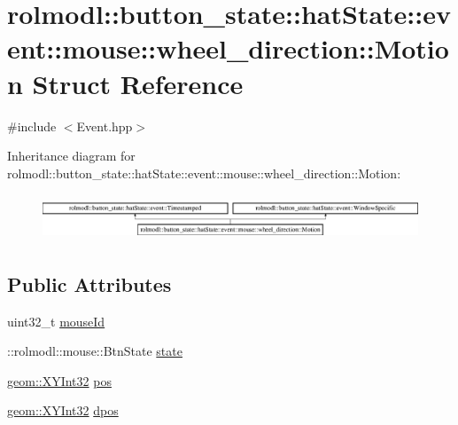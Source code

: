 \hypertarget{structrolmodl_1_1button__state_1_1hat_state_1_1event_1_1mouse_1_1wheel__direction_1_1_motion}{}\section{rolmodl\+::button\+\_\+state\+::hat\+State\+::event\+::mouse\+::wheel\+\_\+direction\+::Motion Struct Reference}
\label{structrolmodl_1_1button__state_1_1hat_state_1_1event_1_1mouse_1_1wheel__direction_1_1_motion}


{\ttfamily \#include $<$Event.\+hpp$>$}

Inheritance diagram for rolmodl\+::button\+\_\+state\+::hat\+State\+::event\+::mouse\+::wheel\+\_\+direction\+::Motion\+:\begin{figure}[H]
\begin{center}
\leavevmode
\includegraphics[height=1.389578cm]{structrolmodl_1_1button__state_1_1hat_state_1_1event_1_1mouse_1_1wheel__direction_1_1_motion}
\end{center}
\end{figure}
\subsection*{Public Attributes}
\begin{DoxyCompactItemize}
\item 
uint32\+\_\+t \mbox{\hyperlink{structrolmodl_1_1button__state_1_1hat_state_1_1event_1_1mouse_1_1wheel__direction_1_1_motion_ad892f48b422e620b4b3855133084ba55}{mouse\+Id}}
\item 
\+::rolmodl\+::mouse\+::\+Btn\+State \mbox{\hyperlink{structrolmodl_1_1button__state_1_1hat_state_1_1event_1_1mouse_1_1wheel__direction_1_1_motion_a8013ec2a62302a4b04a0b202dc310905}{state}}
\item 
\mbox{\hyperlink{structrolmodl_1_1geom_1_1_x_y_int32}{geom\+::\+X\+Y\+Int32}} \mbox{\hyperlink{structrolmodl_1_1button__state_1_1hat_state_1_1event_1_1mouse_1_1wheel__direction_1_1_motion_a419d50a0870e2332472ee26eaaac8fde}{pos}}
\item 
\mbox{\hyperlink{structrolmodl_1_1geom_1_1_x_y_int32}{geom\+::\+X\+Y\+Int32}} \mbox{\hyperlink{structrolmodl_1_1button__state_1_1hat_state_1_1event_1_1mouse_1_1wheel__direction_1_1_motion_a9e2044c1be3e797ce6663be6634f0d31}{dpos}}
\end{DoxyCompactItemize}


